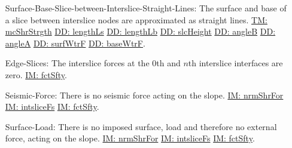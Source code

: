 \documentclass[12pt]{article}
\begin{document}
\begin{itemize}
\item[Surface-Base-Slice-between-Interslice-Straight-Lines:\phantomsection\label{assumpSBSBISL}]The surface and base of a slice between interslice nodes are approximated as straight lines. \hyperref[TM:mcShrStrgth]{TM: mcShrStrgth} \hyperref[DD:lengthLs]{DD: lengthLs} \hyperref[DD:lengthLb]{DD: lengthLb} \hyperref[DD:slcHeight]{DD: slcHeight} \hyperref[DD:angleB]{DD: angleB} \hyperref[DD:angleA]{DD: angleA} \hyperref[DD:surfWtrF]{DD: surfWtrF} \hyperref[DD:baseWtrF]{DD: baseWtrF}.
\item[Edge-Slices:\phantomsection\label{assumpES}]The interslice forces at the 0th and $n$th interslice interfaces are zero. \hyperref[IM:fctSfty]{IM: fctSfty}.
\item[Seismic-Force:\phantomsection\label{assumpSF}]There is no seismic force acting on the slope. \hyperref[IM:nrmShrFor]{IM: nrmShrFor} \hyperref[IM:intsliceFs]{IM: intsliceFs} \hyperref[IM:fctSfty]{IM: fctSfty}.
\item[Surface-Load:\phantomsection\label{assumpSL}]There is no imposed surface, load and therefore no external force, acting on the slope. \hyperref[IM:nrmShrFor]{IM: nrmShrFor} \hyperref[IM:intsliceFs]{IM: intsliceFs} \hyperref[IM:fctSfty]{IM: fctSfty}.
\end{itemize}
\end{document}
